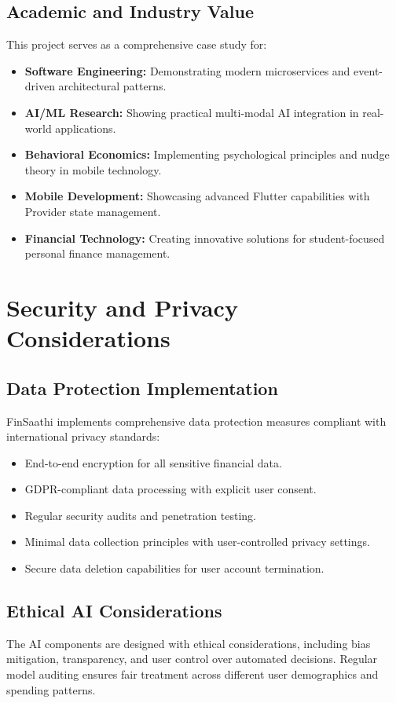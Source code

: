 \documentclass[10pt,twocolumn,twoside,a4paper]{article}
\begin{document}
\subsection{Academic and Industry Value}
This project serves as a comprehensive case study for:
\begin{itemize}[leftmargin=*]
  \item \textbf{Software Engineering:} Demonstrating modern microservices and event-driven architectural patterns.
  \item \textbf{AI/ML Research:} Showing practical multi-modal AI integration in real-world applications.
  \item \textbf{Behavioral Economics:} Implementing psychological principles and nudge theory in mobile technology.
  \item \textbf{Mobile Development:} Showcasing advanced Flutter capabilities with Provider state management.
  \item \textbf{Financial Technology:} Creating innovative solutions for student-focused personal finance management.
\end{itemize}

\section{Security and Privacy Considerations}
\subsection{Data Protection Implementation}
FinSaathi implements comprehensive data protection measures compliant with international privacy standards:
\begin{itemize}[leftmargin=*]
  \item End-to-end encryption for all sensitive financial data.
  \item GDPR-compliant data processing with explicit user consent.
  \item Regular security audits and penetration testing.
  \item Minimal data collection principles with user-controlled privacy settings.
  \item Secure data deletion capabilities for user account termination.
\end{itemize}

\subsection{Ethical AI Considerations}
The AI components are designed with ethical considerations, including bias mitigation, transparency, and user control over automated decisions. Regular model auditing ensures fair treatment across different user demographics and spending patterns.
\end{document}
